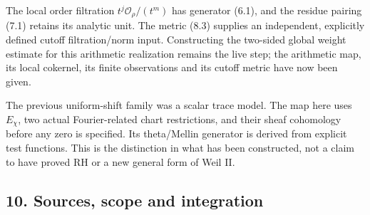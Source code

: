 \documentclass[
]{article}
\begin{document}
The local order filtration \(t^j\mathcal O_\rho/(t^m)\) has generator
(6.1), and the residue pairing (7.1) retains its analytic unit. The
metric (8.3) supplies an independent, explicitly defined cutoff
filtration/norm input. Constructing the two-sided global weight estimate
for this arithmetic realization remains the live step; the arithmetic
map, its local cokernel, its finite observations and its cutoff metric
have now been given.

The previous uniform-shift family was a scalar trace model. The map here
uses \(E_\chi\), two actual Fourier-related chart restrictions, and
their sheaf cohomology before any zero is specified. Its theta/Mellin
generator is derived from explicit test functions. This is the
distinction in what has been constructed, not a claim to have proved RH
or a new general form of Weil II.

\subsection{10. Sources, scope and
integration}\label{sources-scope-and-integration}
\end{document}
